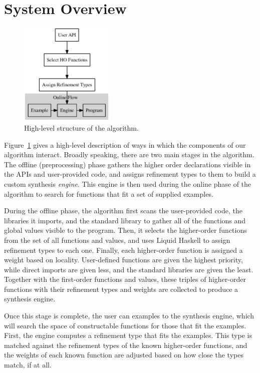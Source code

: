 \section{System Overview}

\begin{figure}[t]
  \centering
  \includegraphics[width=0.4\textwidth]{algo}
  \caption{High-level structure of the algorithm.}
  \label{fig:high_level_overview}
\end{figure}

Figure~\ref{fig:high_level_overview} gives a high-level description of ways in which the components of our algorithm interact. Broadly speaking, there are two main stages in the algorithm. The offline (preprocessing) phase gathers the higher order declarations visible in the APIs and user-provided code, and assigns refinement types to them to build a custom synthesis \textit{engine}. This engine is then used during the online phase of the algorithm to search for functions that fit a set of supplied examples.

During the offline phase, the algorithm first scans the user-provided code, the libraries it imports, and the standard library to gather all of the functions and global values visible to the program. Then, it selects the higher-order functions from the set of all functions and values, and uses Liquid Haskell \cite{DBLP:conf/haskell/VazouSJ14, DBLP:conf/esop/VazouRJ13, DBLP:conf/icfp/VazouSJVJ14} to assign refinement types to each one. Finally, each higher-order function is assigned a weight based on locality\cite{insynthPLDI}. User-defined functions are given the highest priority, while direct imports are given less, and the standard libraries are given the least. Together with the first-order functions and values, these triples of higher-order functions with their refinement types and weights are collected to produce a synthesis engine.

Once this stage is complete, the user can examples to the synthesis engine, which will search the space of constructable functions for those that fit the examples. First, the engine computes a refinement type that fits the examples. This type is matched against the refinement types of the known higher-order functions, and the weights of each known function are adjusted based on how close the types match, if at all.

